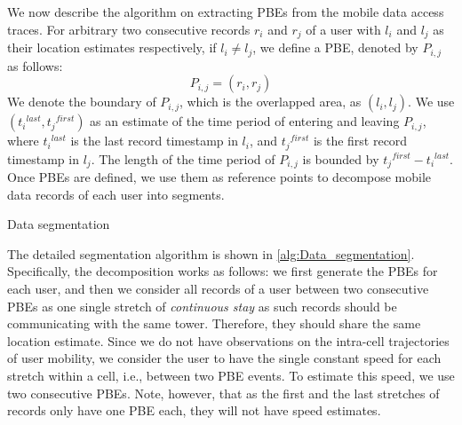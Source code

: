 We now describe the algorithm on extracting PBEs from the mobile data access traces. For arbitrary two consecutive records $r_i$ and $r_j$ of a user with $l_i$ and $l_j$ as their location estimates respectively, if $l_i \neq l_j$, we define a PBE, denoted by $P_{i, j}$ as follows:
\[
P_{i,j} = (r_i, r_j)
\]
We denote the boundary of $P_{i, j}$, which is the overlapped area, as $(l_i, l_j)$. We use $({t_i}^{last}, {t_j}^{first})$ as an estimate of the time period of entering and leaving $P_{i, j}$, where ${t_i}^{last}$ is the last record timestamp in $l_i$, and ${t_j}^{first}$ is the first record timestamp in $l_j$. The length of the time period of $P_{i, j}$ is bounded by ${t_j}^{first} - {t_i}^{last}$.
Once PBEs are defined, we use them as reference points to decompose mobile data records of each user into segments.

\begin{algorithm}
 \caption{Data segmentation}\label{alg:Data_segmentation}
\end{algorithm}

The detailed segmentation algorithm is shown in \autoref{alg:Data_segmentation}. Specifically, the decomposition works as follows: we first generate the PBEs for each user, and then we consider all records of a user between two consecutive PBEs as one single stretch of \emph{continuous stay} as such records should be communicating with the same tower. Therefore, they should share the same location estimate. Since we do not have observations on the intra-cell trajectories of user mobility, we consider the user to have the single constant speed for each stretch within a cell, i.e., between two PBE events. To estimate this speed, we use two consecutive PBEs.
Note, however, that as the first and the last stretches of records only have one PBE each, they will not have speed estimates.

